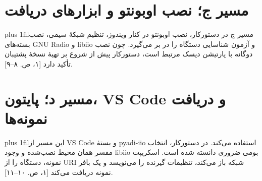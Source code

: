 \documentclass[10pt,a4paper]{article}
\newcommand{\rtl}[1]{\beginR #1\endR}
\newcommand{\lr}[1]{\beginL{\latinfont #1}\endL}
\newcommand{\rp}[1]{\par\begingroup\rightskip=0pt\leftskip=0pt plus 1fil\parfillskip=0pt\noindent\beginR #1\endR\par\endgroup}
\begin{document}
\section{\rtl{مسیر ج؛ نصب اوبونتو و ابزارهای دریافت}}
\rp{مسیر ج در دستورکار، نصب اوبونتو در کنار ویندوز، تنظیم شبکهٔ سیمی، نصب بسته‌های GNU Radio و libiio و آزمون شناسایی دستگاه را در بر می‌گیرد. چون نصب دوگانه با پارتیشن دیسک مرتبط است، دستورکار پیش از شروع بر تهیهٔ نسخهٔ پشتیبان تأکید دارد [۱، ص. ۸–۹].}
%
%

\section{\rtl{مسیر د؛ پایتون، VS Code و دریافت نمونه‌ها}}
\rp{این مسیر از VS Code و بستهٔ pyadi-iio استفاده می‌کند. در دستورکار، انتخاب مفسر همان محیط نصب‌شده و وجود libiio بومی ضروری دانسته شده است. اسکریپت نمونه، دستگاه را از URI شبکه باز می‌کند، تنظیمات گیرنده را می‌نویسد و یک بافر نمونه دریافت می‌کند [۱، ص. ۱۰–۱۱].}
\end{document}
